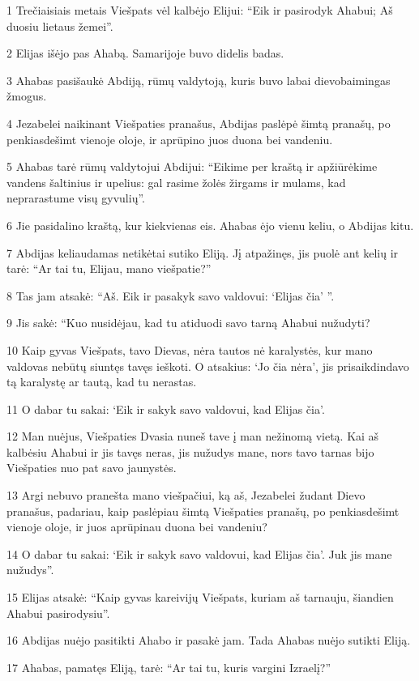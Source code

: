 \par 1 Trečiaisiais metais Viešpats vėl kalbėjo Elijui: “Eik ir pasirodyk Ahabui; Aš duosiu lietaus žemei”. 
\par 2 Elijas išėjo pas Ahabą. Samarijoje buvo didelis badas. 
\par 3 Ahabas pasišaukė Abdiją, rūmų valdytoją, kuris buvo labai dievobaimingas žmogus. 
\par 4 Jezabelei naikinant Viešpaties pranašus, Abdijas paslėpė šimtą pranašų, po penkiasdešimt vienoje oloje, ir aprūpino juos duona bei vandeniu. 
\par 5 Ahabas tarė rūmų valdytojui Abdijui: “Eikime per kraštą ir apžiūrėkime vandens šaltinius ir upelius: gal rasime žolės žirgams ir mulams, kad neprarastume visų gyvulių”. 
\par 6 Jie pasidalino kraštą, kur kiekvienas eis. Ahabas ėjo vienu keliu, o Abdijas kitu. 
\par 7 Abdijas keliaudamas netikėtai sutiko Eliją. Jį atpažinęs, jis puolė ant kelių ir tarė: “Ar tai tu, Elijau, mano viešpatie?” 
\par 8 Tas jam atsakė: “Aš. Eik ir pasakyk savo valdovui: ‘Elijas čia’ ”. 
\par 9 Jis sakė: “Kuo nusidėjau, kad tu atiduodi savo tarną Ahabui nužudyti? 
\par 10 Kaip gyvas Viešpats, tavo Dievas, nėra tautos nė karalystės, kur mano valdovas nebūtų siuntęs tavęs ieškoti. O atsakius: ‘Jo čia nėra’, jis prisaikdindavo tą karalystę ar tautą, kad tu nerastas. 
\par 11 O dabar tu sakai: ‘Eik ir sakyk savo valdovui, kad Elijas čia’. 
\par 12 Man nuėjus, Viešpaties Dvasia nuneš tave į man nežinomą vietą. Kai aš kalbėsiu Ahabui ir jis tavęs neras, jis nužudys mane, nors tavo tarnas bijo Viešpaties nuo pat savo jaunystės. 
\par 13 Argi nebuvo pranešta mano viešpačiui, ką aš, Jezabelei žudant Dievo pranašus, padariau, kaip paslėpiau šimtą Viešpaties pranašų, po penkiasdešimt vienoje oloje, ir juos aprūpinau duona bei vandeniu? 
\par 14 O dabar tu sakai: ‘Eik ir sakyk savo valdovui, kad Elijas čia’. Juk jis mane nužudys”. 
\par 15 Elijas atsakė: “Kaip gyvas kareivijų Viešpats, kuriam aš tarnauju, šiandien Ahabui pasirodysiu”. 
\par 16 Abdijas nuėjo pasitikti Ahabo ir pasakė jam. Tada Ahabas nuėjo sutikti Eliją. 
\par 17 Ahabas, pamatęs Eliją, tarė: “Ar tai tu, kuris vargini Izraelį?” 
